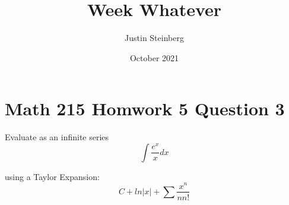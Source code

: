 \documentclass{article}
\title{Week Whatever}
\author{Justin Steinberg}
\date{October 2021}
\begin{document}
\maketitle

\section{Math 215 Homwork 5 Question 3}

Evaluate as an infinite series
\begin{equation}
    \int{\frac{e^x}{x} dx}
\end{equation}

using a Taylor Expansion:
\begin{equation}
    C + ln|x| + \sum{\frac{x^n}{nn!}}
\end{equation}
\end{document}
